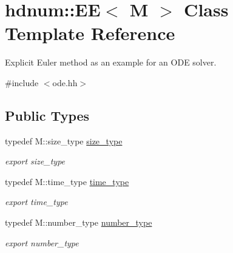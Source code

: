 \hypertarget{classhdnum_1_1EE}{
\section{hdnum::EE$<$ M $>$ Class Template Reference}
\label{classhdnum_1_1EE}
}


Explicit Euler method as an example for an ODE solver.  




{\ttfamily \#include $<$ode.hh$>$}

\subsection*{Public Types}
\begin{DoxyCompactItemize}
\item 
\hypertarget{classhdnum_1_1EE_a633508b18536c883d9fbbcccb7ac7ebc}{
typedef M::size\_\-type \hyperlink{classhdnum_1_1EE_a633508b18536c883d9fbbcccb7ac7ebc}{size\_\-type}}
\label{classhdnum_1_1EE_a633508b18536c883d9fbbcccb7ac7ebc}

\begin{DoxyCompactList}\small\item\em export size\_\-type \item\end{DoxyCompactList}\item 
\hypertarget{classhdnum_1_1EE_a812a3ec962aa0b2924e30830828bf306}{
typedef M::time\_\-type \hyperlink{classhdnum_1_1EE_a812a3ec962aa0b2924e30830828bf306}{time\_\-type}}
\label{classhdnum_1_1EE_a812a3ec962aa0b2924e30830828bf306}

\begin{DoxyCompactList}\small\item\em export time\_\-type \item\end{DoxyCompactList}\item 
\hypertarget{classhdnum_1_1EE_a1ef3f42ee12273be741369aa6fd198cd}{
typedef M::number\_\-type \hyperlink{classhdnum_1_1EE_a1ef3f42ee12273be741369aa6fd198cd}{number\_\-type}}
\label{classhdnum_1_1EE_a1ef3f42ee12273be741369aa6fd198cd}

\begin{DoxyCompactList}\small\item\em export number\_\-type \item\end{DoxyCompactList}\end{DoxyCompactItemize}

